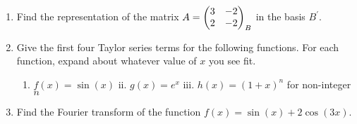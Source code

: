 \documentclass{article}
\begin{document}
\begin{enumerate}
\begin{enumerate}[label=i]
  \end{enumerate}
  \vspace{5cm}
  \item Find the representation of the matrix
  $A=\mqty(3&-2\\2&-2)_B$ in the basis $B^\prime$.
  \vspace{5cm}
    \item Give the first four Taylor series terms for the following functions. For each function, expand about whatever value of $x$ you see fit.
        \begin{enumerate}[label=i.]
                \item $f(x) = \sin(x)$ \hspace{2cm}
                ii. $g(x) = e^x$
                \hspace{2cm} 
                iii. $h(x) = (1 + x)^n$ for non-integer $n$
            \vspace{5cm}
        \end{enumerate}
    \item Find the Fourier transform of the function
    $f(x) = \sin(x) + 2\cos(3x)$.
\end{enumerate}
\end{document}
